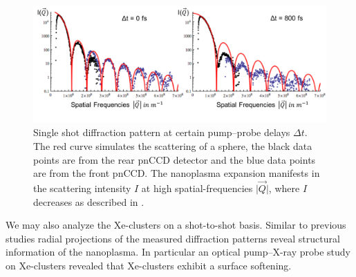 %
%
%
\begin{figure}
	\centering
		\includegraphics[width=1.0\textwidth]{images/results/Xe-diff-pattern.png}
	\caption[Single-shot diffraction pattern of Xe-cluster at varying time delays]{Single shot diffraction pattern at certain pump--probe delays $\Delta t$. The red curve simulates the scattering of a sphere, the black data points are from the rear pnCCD detector and the blue data points are from the front pnCCD. The nanoplasma expansion manifests in the scattering intensity $I$ at high spatial-frequencies $\lvert \vec{Q}\rvert$, where $I$ decreases as described in \citep{Gorkhover-2016-NatPho}.}
	\label{fig:Xe-only-diff-pattern}
\end{figure}
We may also analyze the Xe-clusters on a shot-to-shot basis. Similar to previous studies \cite{Gorkhover-2016-NatPho,Rupp-2016-Springer,Bostedt-2012-PRL} radial projections of the measured diffraction patterns reveal structural information of the nanoplasma. In particular an optical pump--X-ray probe study on Xe-clusters \cite{Gorkhover-2016-NatPho} revealed that Xe-clusters exhibit a surface softening.

